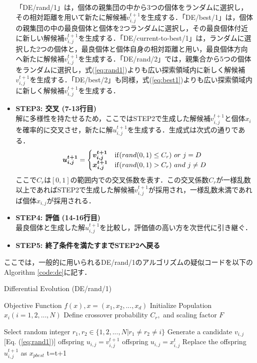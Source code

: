 \documentclass[a4j,11pt]{jarticle}
\begin{document}
\begin{itemize}
「DE/rand/1」は，個体の親集団の中から3つの個体をランダムに選択し，その相対距離を用いて新たに解候補$v_{i,j}^{t+1}$を生成する．「DE/best/1」は，個体の親集団の中の最良個体と個体を2つランダムに選択し，その最良個体付近に新しい解候補$v_{i,j}^{t+1}$を生成する．「DE/current-to-best/1」は，ランダムに選択した2つの個体と，最良個体と個体自身の相対距離と用い，最良個体方向へ新たに解候補$v_{i,j}^{t+1}$を生成する．「DE/rand/2」では，親集合から5つの個体をランダムに選択し，式(\ref{eq:rand1})よりも広い探索領域内に新しく解候補$v_{i,j}^{t+1}$を生成する．「DE/best/2」も同様，式(\ref{eq:best1})よりも広い探索領域内に新しく解候補$v_{i,j}^{t+1}$を生成する．

\item {\bf STEP3: 交叉 (7-13行目)} \\
解に多様性を持たせるため，ここではSTEP2で生成した解候補$v_{i,j}^{t+1}$と個体$x_i$を確率的に交叉させ，新たに解$u_{i,j}^{t+1}$を生成する．生成式は次式の通りである．
\begin{equation}
\mbox{\boldmath $u_{i,j}^{t+1}$}=\begin{cases}
\mbox{\boldmath $v_{i,j}^{t+1}$} & {\rm if}(rand(0,1) \leq C_r) \ or \ j=D \\
\mbox{\boldmath $x_{i,j}^{t+1}$} & {\rm if}(rand(0,1) > C_r) \ and \ j \neq D
\end{cases}
\end{equation}
ここで$C_r$は$[0,1]$の範囲内での交叉係数を表す．この交叉係数$C_r$が一様乱数以上であればSTEP2で生成した解候補$v_{i,j}^{t+1}$が採用され，一様乱数未満であれば個体$x_{i,j}$が採用される．

\item {\bf STEP4: 評価 (14-16行目)} \\
最良個体と生成した解$u_{i,j}^{t+1}$を比較し，評価値の高い方を次世代に引き継ぐ．

\item {\bf STEP5: 終了条件を満たすまでSTEP2へ戻る}
\end{itemize}

ここでは，一般的に用いられるDE/rand/1のアルゴリズムの疑似コードを以下のAlgorithm \ref{code:de}に記す．

\begin{algorithm}[H]
\caption{Differential Evolution (DE/rand/1)}
\label{code:de}
\begin{algorithmic}[3]
\REQUIRE Objective Function $f(x), x=(x_1,x_2,...,x_d)$
\STATE Initialize Population $x_i (i=1,2,...,N)$ 
\STATE Define crossover probability $C_r,$ and scaling factor $F$

\STATE Select random integer $r_1, r_2 \in \{ 1,2,..., N| r_1 \neq r_2 \neq i\}$
\STATE Generate a candidate $v_{i,j}$  [Eq. (\ref{eq:rand1})]
\STATE offspring $u_{i,j} = v_{i,j}^{t+1}$
\STATE offspring $u_{i,j} = x_{i,j}^t$
\ENDIF
\ENDFOR
{}
\STATE Replace the offspring $u_{i,j}^{t+1}$ as $x_{pbest}$
\ENDIF
\ENDFOR
\STATE t=t+1
\ENDWHILE
\end{algorithmic}
\end{algorithm}
\end{document}
